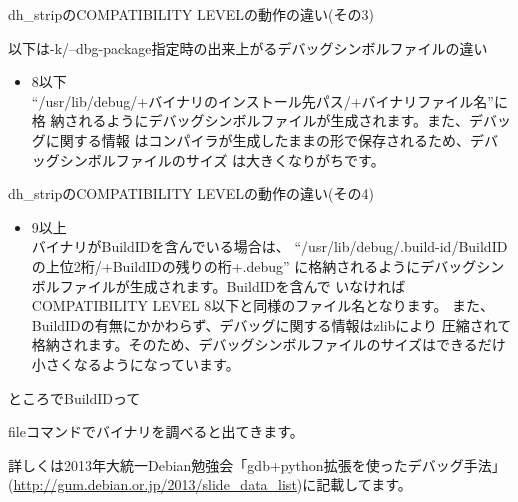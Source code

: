 \begin{frame}{dh\_stripのCOMPATIBILITY LEVELの動作の違い(その3)}

以下は-k/--dbg-package指定時の出来上がるデバッグシンボルファイルの違い

\begin{itemize}
\item 8以下\\
 ``/usr/lib/debug/+バイナリのインストール先パス/+バイナリファイル名''に格
納されるようにデバッグシンボルファイルが生成されます。また、デバッグに関する情報
はコンパイラが生成したままの形で保存されるため、デバッグシンボルファイルのサイズ
は大きくなりがちです。
\end{itemize}

\end{frame}

\begin{frame}{dh\_stripのCOMPATIBILITY LEVELの動作の違い(その4)}
\begin{itemize}
\item 9以上\\
バイナリがBuildIDを含んでいる場合は、
``/usr/lib/debug/.build-id/BuildIDの上位2桁/+BuildIDの残りの桁+.debug''
に格納されるようにデバッグシンボルファイルが生成されます。BuildIDを含んで
いなければCOMPATIBILITY LEVEL 8以下と同様のファイル名となります。
また、BuildIDの有無にかかわらず、デバッグに関する情報はzlibにより
圧縮されて格納されます。そのため、デバッグシンボルファイルのサイズはできるだけ
小さくなるようになっています。
\end{itemize}

\end{frame}

\begin{frame}[containsverbatim]{ところでBuildIDって}

 fileコマンドでバイナリを調べると出てきます。

 
 詳しくは2013年大統一Debian勉強会「gdb+python拡張を使ったデバッグ手法」
(\url{http://gum.debian.or.jp/2013/slide_data_list})に記載してます。

\end{frame}

